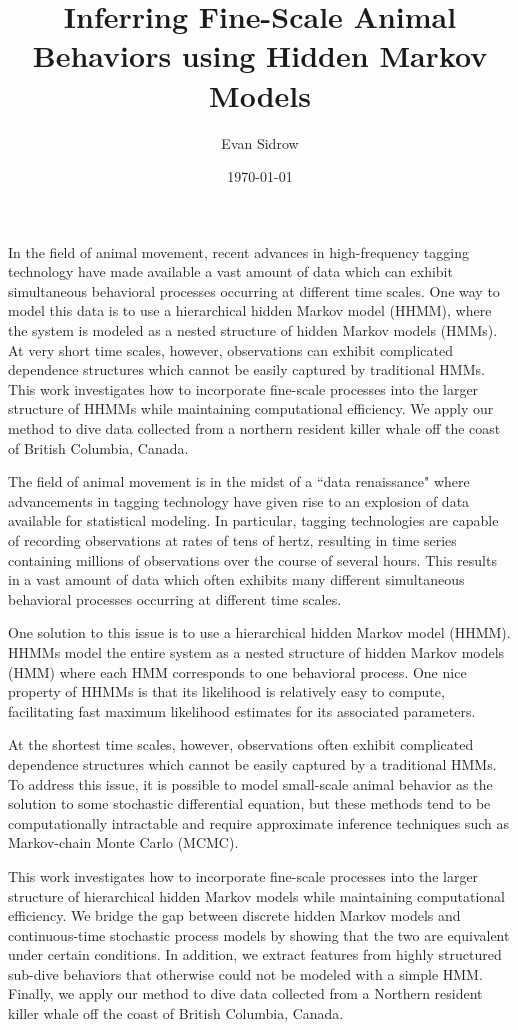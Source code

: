\documentclass[10pt]{article}
\title{Inferring Fine-Scale Animal Behaviors using Hidden Markov Models}
\author{Evan Sidrow}
\date{\today}
\begin{document}
\maketitle

\abstract

In the field of animal movement, recent advances in high-frequency tagging technology have made available a vast amount of data which can exhibit simultaneous behavioral processes occurring at different time scales. One way to model this data is to use a hierarchical hidden Markov model (HHMM), where the system is modeled as a nested structure of hidden Markov models (HMMs). At very short time scales, however, observations can exhibit complicated dependence structures which cannot be easily captured by traditional HMMs. This work investigates how to incorporate fine-scale processes into the larger structure of HHMMs while maintaining computational efficiency. We apply our method to dive data collected from a northern resident killer whale off the coast of British Columbia, Canada.

The field of animal movement is in the midst of a ``data renaissance" where advancements in tagging technology have given rise to an explosion of data available for statistical modeling. In particular, tagging technologies are capable of recording observations at rates of tens of hertz, resulting in time series containing millions of observations over the course of several hours. This results in a vast amount of data which often exhibits many different simultaneous behavioral processes occurring at different time scales. 

One solution to this issue is to use a hierarchical hidden Markov model (HHMM). HHMMs model the entire system as a nested structure of hidden Markov models (HMM) where each HMM corresponds to one behavioral process. One nice property of HHMMs is that its likelihood is relatively easy to compute, facilitating fast maximum likelihood estimates for its associated parameters.  

At the shortest time scales, however, observations often exhibit complicated dependence structures which cannot be easily captured by a traditional HMMs. To address this issue, it is possible to model small-scale animal behavior as the solution to some stochastic differential equation, but these methods tend to be computationally intractable and require approximate inference techniques such as Markov-chain Monte Carlo (MCMC).

This work investigates how to incorporate fine-scale processes into the larger structure of hierarchical hidden Markov models while maintaining computational efficiency. We bridge the gap between discrete hidden Markov models and continuous-time stochastic process models by showing that the two are equivalent under certain conditions. In addition, we extract features from highly structured sub-dive behaviors that otherwise could not be modeled with a simple HMM. Finally, we apply our method to dive data collected from a Northern resident killer whale off the coast of British Columbia, Canada.

%







\newpage




\newpage


\end{document}

